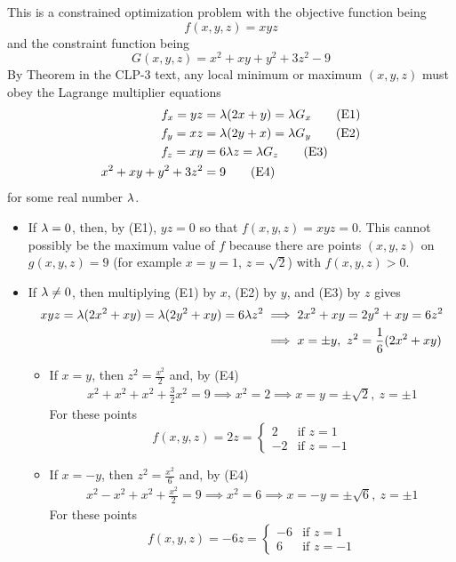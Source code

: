 \begin{solution}
 This is a constrained optimization problem with the objective function being
\begin{equation*}
f(x,y,z) = xyz
\end{equation*}
and the constraint function  being 
\begin{equation*}
G(x,y,z) =x^2 + xy + y^2 + 3z^2 - 9
\end{equation*}
By Theorem  in the CLP-3 text, any local minimum
or maximum $(x,y,z)$ must obey the  Lagrange multiplier equations
\begin{align*}
f_x = yz &= \lambda (2x+y) = \lambda G_x \tag{E1} \\ 
f_y = xz &= \lambda (2y+x) = \lambda G_y \tag{E2} \\ 
f_z = xy &= 6\lambda z = \lambda G_z \tag{E3} \\ 
x^2 + xy + y^2 + 3z^2  &= 9 \tag{E4}
\end{align*}
for some real number $\lambda$.
\begin{itemize}
\item 
If $\lambda=0$, then, by (E1), $yz=0$ so that $f(x,y,z)=xyz=0$. This cannot 
possibly be the maximum value of $f$ because there are points $(x,y,z)$
on $g(x,y,z)=9$ (for example $x=y=1$, $z=\sqrt{2}$) with $f(x,y,z)>0$.

\item
If $\lambda\ne 0$, then multiplying (E1) by $x$, (E2) by $y$, and (E3) by $z$
gives
\begin{align*}
xyz = \lambda (2x^2+xy) = \lambda(2y^2 +xy) =6\lambda z^2
&\implies 2x^2+xy =2y^2 +xy =6z^2 \\
&\implies x=\pm y,\ z^2=\frac{1}{6}(2x^2+xy)
\end{align*}
\begin{itemize}
\item 
If $x=y$, then $z^2=\frac{x^2}{2}$ and, by (E4)
\begin{align*}
x^2+x^2+x^2 +\frac{3}{2}x^2=9
\implies x^2=2
\implies x=y=\pm \sqrt{2},\ z=\pm 1
\end{align*}
For these points
\begin{equation*}
f(x,y,z)=2z=\begin{cases}
                  2&\text{if }z=1 \\
                 -2&\text{if }z=-1
              \end{cases}
\end{equation*}  

\item
If $x=-y$, then $z^2=\frac{x^2}{6}$ and, by (E4)
\begin{align*}
x^2-x^2+x^2 +\frac{x^2}{2}=9
\implies x^2=6
\implies x=-y=\pm \sqrt{6},\ z=\pm 1
\end{align*}
For these points
\begin{equation*}
f(x,y,z)=-6z=\begin{cases}
                  -6&\text{if }z=1 \\
                   6&\text{if }z=-1
              \end{cases}
\end{equation*}
\end{itemize}


\end{itemize}
\end{solution}
